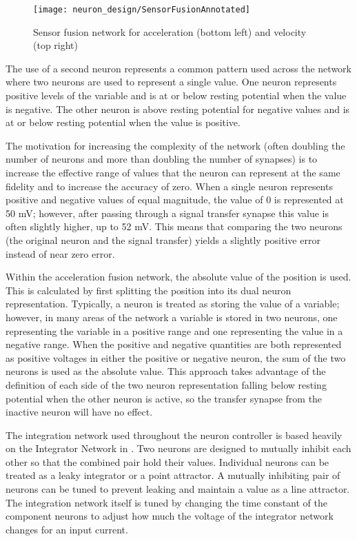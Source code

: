 \begin{figure}
\centering
\texttt{[image: neuron\_design/SensorFusionAnnotated]}
\caption{Sensor fusion network for acceleration (bottom left) and velocity (top right)}
\label{fig:SensorFusion}
\end{figure}

The use of a second neuron represents
a common pattern used across the network where two neurons are used to represent
a single value. One neuron represents positive levels of the variable and is 
at or below resting potential when the value is negative. The other neuron is
above resting potential for negative values and is at or below resting potential
when the value is positive. 

The motivation for increasing the complexity of the
network (often doubling the number of neurons and more than doubling the number of synapses) is to increase the
effective range of values that the neuron can represent at the same fidelity and
to increase the accuracy of zero. When a single neuron represents positive and
negative values of equal magnitude, the value of 0 is represented at 50 mV; 
however, after passing through a signal transfer synapse this value is often
slightly higher, up to 52 mV. This means that comparing the two neurons (the
original neuron and the signal transfer) yields a slightly positive error
instead of near zero error.



Within the acceleration fusion network, the absolute value of the position is
used. This is calculated by first splitting the position into its dual neuron
representation. Typically, a neuron is treated as storing the value of a variable; however, in many areas of the network a variable is stored in two neurons, one representing the variable in a positive range and one representing the value in a negative range. When the positive and negative quantities are both represented as positive voltages in either the positive or negative neuron, the sum of the two neurons is used as the absolute
value. This approach takes advantage of the definition of each side of the two neuron
representation falling below resting potential when the other neuron is active, so the transfer synapse from the inactive neuron will have no
effect.


The integration network used throughout the neuron controller is based heavily
on the Integrator Network in \cite{NickFunctionalSubnetwork}. Two neurons are
designed to mutually inhibit each other so that the combined pair hold their
values. Individual neurons can be treated as a leaky integrator or a point attractor. A mutually inhibiting pair of neurons can be tuned to prevent leaking and maintain a value as a line attractor.
 The integration
network itself is tuned by changing the time constant of the component neurons
to adjust how much the voltage of the integrator network changes for an input
current.

